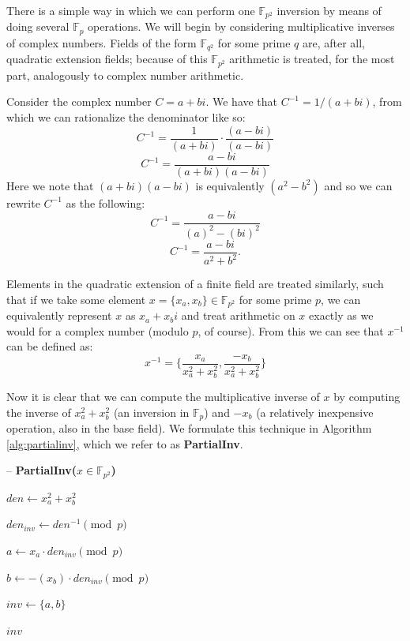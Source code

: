 There is a simple way in which we can perform one $\mathbb{F}_{p^{2}}$ inversion by means of doing several $\mathbb{F}_{p}$ operations. We will begin by considering multiplicative inverses of complex numbers. Fields of the form $\mathbb{F}_{q^{2}}$ for some prime $q$ are, after all, quadratic extension fields; because of this $\mathbb{F}_{p^{2}}$ arithmetic is treated, for the most part, analogously to complex number arithmetic.

Consider the complex number $C = a + bi$. We have that $C^{-1} = 1 / (a + bi)$, from which we can rationalize the denominator like so:\\
$$
C^{-1} = \frac {1}{(a + bi)} \cdot \frac{(a - bi)}{(a - bi)}
$$
$$
C^{-1} = \frac {a - bi}{(a + bi)(a - bi)}
$$
Here we note that $(a + bi)(a - bi)$ is equivalently $(a^2 - b^2)$ and so we can rewrite $C^{-1}$ as the following:
$$
C^{-1} = \frac {a - bi}{(a)^2 - (bi)^2}
$$
$$
C^{-1} = \frac {a - bi}{a^2 + b^2}.
$$

Elements in the quadratic extension of a finite field are treated similarly, such that if we take some element $x = \{x_{a}, x_{b}\} \in \mathbb{F}_{p^{2}}$ for some prime $p$, we can equivalently represent $x$ as $x_{a} + x_{b}i$ and treat arithmetic on $x$ exactly as we would for a complex number (modulo $p$, of course). From this we can see that $x^{-1}$ can be defined as:
$$
x^{-1} = \{\frac {x_{a}}{x_{a}^2 + x_{b}^2}, \frac {-x_{b}}{x_{a}^2 + x_{b}^2}\}
$$

Now it is clear that we can compute the multiplicative inverse of $x$ by computing the inverse of $x_{a}^2 + x_{b}^2$ (an inversion in $\mathbb{F}_{p}$) and $-x_{b}$ (a relatively inexpensive operation, also in the base field). We formulate this technique in Algorithm \ref{alg:partialinv}, which we refer to as \textbf{PartialInv}.\\

\begin{algorithm}[!h]
\label{alg:partialinv}
\caption{-- \textbf{PartialInv($x \in \mathbb{F}_{p^{2}}$)}}\label{alg:partialinv}
\begin{algorithmic}[1]
\State $den \gets x_{a}^{2} + x_{b}^{2}$

\State $den_{inv} \gets den^{-1} \pmod{p}$

\State $a \gets x_{a} \cdot den_{inv} \pmod{p}$

\State $b \gets -(x_{b}) \cdot den_{inv} \pmod{p}$

\State $inv \gets \{a, b\}$

\State \Return $inv$
\end{algorithmic}
\end{algorithm}


